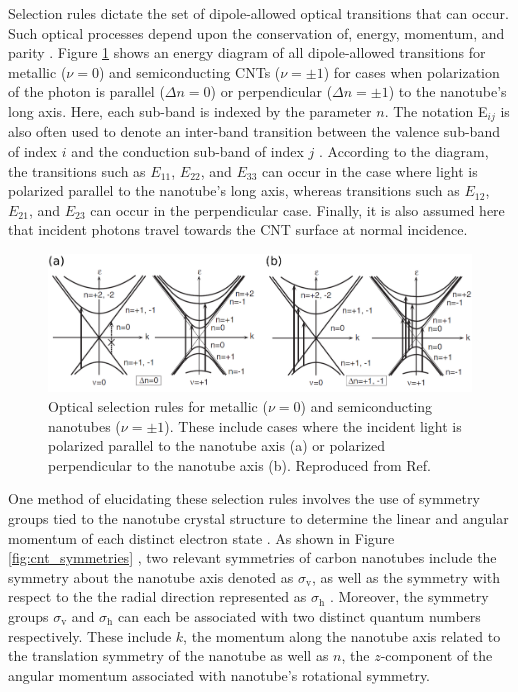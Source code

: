 Selection rules dictate the set of dipole-allowed optical transitions that can occur. Such optical processes depend upon the conservation of, energy, momentum, and parity \cite{bovzovic2000optical}. Figure \ref{fig:allowed_optical_transitions} shows an energy diagram of all dipole-allowed transitions for metallic ($\nu = 0$) and semiconducting CNTs ($\nu=\pm 1$) for cases when polarization of the photon is parallel ($\Delta n = 0 $) or perpendicular ($\Delta n = \pm 1 $) to the nanotube's long axis. Here, each sub-band is indexed by the parameter $n$. The notation E$_{ij}$ is also often used to denote an inter-band transition between the valence sub-band of index $i$ and the conduction sub-band of index $j$ \cite{weismanKonoBook}. According to the diagram, the transitions such as $E_{11}$, $E_{22}$, and $E_{33}$ can occur in the case where light is polarized parallel to the nanotube's long axis, whereas transitions such as $E_{12}$, $E_{21}$, and $E_{23}$ can occur in the perpendicular case. Finally, it is also assumed here that incident photons travel towards the CNT surface at normal incidence.

\begin{figure}[ht]
	\centering
	\includegraphics[scale= 0.52]{images/chapter_optical_props/selection_rules_combined}
	\caption{Optical selection rules for metallic ($\nu = 0 $) and semiconducting nanotubes ($\nu = \pm 1$). These include cases where the incident light is polarized parallel to the nanotube axis (a) or polarized perpendicular to the nanotube axis (b). Reproduced from Ref.\ \cite{ando2005theory}}
	\label{fig:allowed_optical_transitions}
\end{figure}

 One method of elucidating these selection rules involves the use of symmetry groups tied to the nanotube crystal structure to determine the linear and angular momentum of each distinct electron state \cite{bovzovic2000optical}. As shown in Figure \ref{fig:cnt_symmetries} , two relevant symmetries of carbon nanotubes include the symmetry about the nanotube axis denoted as $\sigma_\text{v}$, as well as the symmetry with respect to the the radial direction represented as $\sigma_\text{h}$ \cite{bovzovic2000optical}. Moreover, the symmetry groups $\sigma_\text{v}$ and $\sigma_\text{h}$ can each be associated with two distinct quantum numbers respectively. These include $k$, the momentum along the nanotube axis related to the translation symmetry of the nanotube as well as $n$, the $z$-component of the angular momentum associated with nanotube's rotational symmetry.

